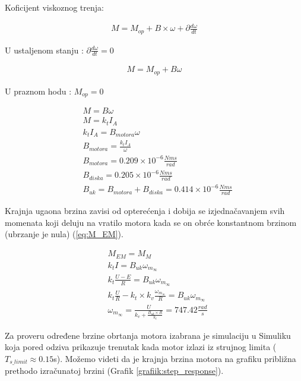 \documentclass[a4paper, 12pt]{article}
\begin{document}
\vspace{10pt}

Koficijent viskoznog trenja:

\begin{align}
M = M_{op} + B \times \omega + \partial \frac{d \omega}{dt} \label{eq:M}
\end{align}

U ustaljenom stanju : $\partial \frac{d \omega}{dt} = 0$

\begin{align*}
M = M_{op} + B \omega
\end{align*}

U praznom hodu : $M _{op} = 0$

\begin{align*}
& M = B \omega\\
& M= k_t I_A\\
& k_t I_A = B_{motora} \omega \\
& B_{motora} = \frac{k_t I_A}{\omega} \\ 
& B_{motora} = 0.209 \times 10^{-6} \frac{Nms}{rad}\\
& B_{diska} = 0.205 \times 10^{-6} \frac{Nms}{rad} \\
& B_{uk} = B_{motora} + B_{diska} = 0.414 \times 10^{-6} \frac{Nms}{rad}
\end{align*}

Krajnja ugaona brzina zavisi od opterećenja i dobija se izjednačavanjem svih momenata koji deluju na vratilo motora kada se on obrće konstantnom brzinom (ubrzanje je nula) (\ref{eq:M_EM}).

\begin{align}
& M_{EM} = M_M \label{eq:M_EM} \\
& k_tI = B_{uk} \omega_{m_\infty} \nonumber \\
& k_t \frac{U-E}{R} = B_{uk} \omega_{m_\infty} \nonumber \\
& k_t \frac{U}{R} - k_t \times k_v \frac{\omega_{m_\infty}}{R} =  B_{uk} \omega_{m_\infty} \nonumber \\
& \omega_{m_\infty} = \frac{U}{ k_v + \frac{B_{uk} \times R}{k_t} } = 747.42 \frac{rad}{s} \nonumber
\end{align}


\vspace{10pt}


Za proveru određene brzine obrtanja motora izabrana je simulaciju u Simuliku koja pored odziva prikazuje trenutak kada motor izlazi iz strujnog limita ($T_{s\_limit} \approx 0.15$s). Možemo videti da je krajnja brzina motora na grafiku približna prethodo izračunatoj brzini (Grafik \ref{grafiik:step_response}).
\end{document}

